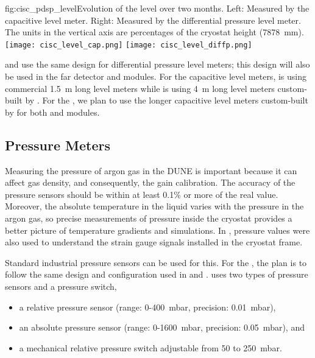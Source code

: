 \begin{dunefigure}{fig:cisc_pdsp_level}{Evolution of the  \lar level over two months. Left: Measured by the capacitive level meter. Right: Measured by the differential pressure level meter. The units in the vertical axis are percentages of the cryostat height (\SI{7878}{mm}).}
  \texttt{[image: cisc\_level\_cap.png]}%
  \hspace*{1cm}
  \texttt{[image: cisc\_level\_diffp.png]}%
\end{dunefigure}

 and  use the same design for differential pressure level meters; this design  will also be used in the far detector  and  modules. For the capacitive level meters,  is using commercial  \SI{1.5}{m} long level meters while  is using \SI{4}{m} long level meters custom-built by . For the  , we plan to use the longer capacitive level meters custom-built by  for both  and  modules.



\subsection{Pressure Meters}
\label{sec:fdgen-slow-cryo-press-meter}


Measuring the pressure of argon gas in the DUNE  is important because it can affect gas density, and consequently, the  gain calibration. The accuracy of the pressure sensors should be within at least 0.1\% or more of the real value. %
Moreover, the absolute temperature in the liquid varies with the pressure in the argon gas, so precise measurements of pressure inside the cryostat provides a better picture of temperature gradients and  simulations. In , pressure values were also used to understand the strain gauge signals installed in the cryostat frame.

Standard industrial pressure sensors can be used for this. For the  , the plan is to follow the same design and configuration used in  and .  uses two types of pressure sensors and a pressure switch, %
\begin{itemize}
    \item a relative pressure sensor (range: 0-400~mbar, precision: 0.01~mbar),
    \item an absolute pressure sensor (range: 0-1600~mbar, precision: 0.05~mbar), and
    \item a mechanical relative pressure switch adjustable from 50 to 250~mbar. 
\end{itemize}


